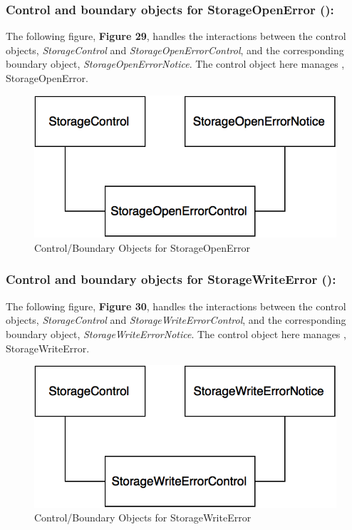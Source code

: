 \documentclass[12pt,letterpaper]{article}
\begin{document}
\subsubsection*{Control and boundary objects for StorageOpenError (\storageopenerror{}):}

The following figure, {\bf Figure 29}, handles the interactions between the control objects, {\it StorageControl} and {\it StorageOpenErrorControl}, and the corresponding boundary object, 
{\it StorageOpenErrorNotice}. The control object here manages \storageopenerror{}, StorageOpenError.

\begin{figure}[H]
	\centering{}
	\includegraphics[scale=0.37]{imgs/cbod/storage-open-error.png}
	\caption{Control/Boundary Objects for StorageOpenError}
\end{figure}

\subsubsection*{Control and boundary objects for StorageWriteError (\storagewriteerror{}):}

The following figure, {\bf Figure 30}, handles the interactions between the control objects, {\it StorageControl} and {\it StorageWriteErrorControl}, and the corresponding boundary object, 
{\it StorageWriteErrorNotice}. The control object here manages \storagewriteerror{}, StorageWriteError.

\begin{figure}[H]
	\centering{}
	\includegraphics[scale=0.37]{imgs/cbod/storage-write-error.png}
	\caption{Control/Boundary Objects for StorageWriteError}
\end{figure}
\end{document}
